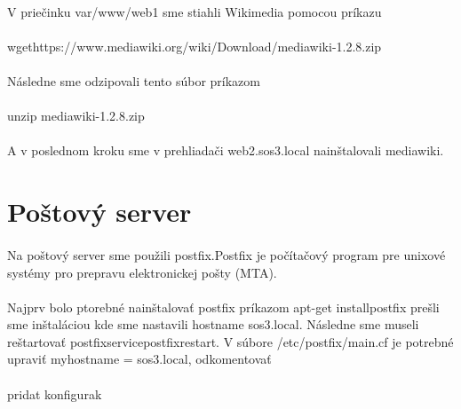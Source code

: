 \paragraph{}
V priečinku var/www/web1 sme stiahli Wikimedia pomocou príkazu\\
\paragraph{}
wgethttps://www.mediawiki.org/wiki/Download/mediawiki-1.2.8.zip\\
\paragraph{}
Následne sme odzipovali tento súbor príkazom\\
\paragraph{}
unzip mediawiki-1.2.8.zip\\
\paragraph{}
A v poslednom kroku sme v prehliadači web2.sos3.local nainštalovali mediawiki.

\section{Poštový server}
\paragraph{}
Na poštový server sme použili postfix.Postfix je počítačový program pre unixové systémy pro prepravu elektronickej pošty (MTA).
\paragraph{}
Najprv bolo ptorebné nainštalovať postfix príkazom apt-get installpostfix prešli sme inštaláciou kde sme nastavili hostname sos3.local. Následne sme museli reštartovať postfixservicepostfixrestart. V súbore /etc/postfix/main.cf je potrebné upraviť myhostname = sos3.local, odkomentovať\\
\paragraph{}
pridat konfigurak
